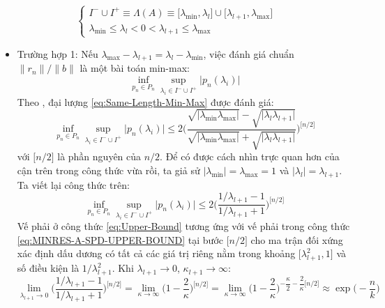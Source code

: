 \documentclass[14pt, a4paper]{article}
\numberwithin{equation}{section}
\numberwithin{algorithm}{section}
\numberwithin{figure}{section}
\numberwithin{dl}{section}
\numberwithin{md}{section}
\numberwithin{bd}{section}
\numberwithin{dn}{section}
\numberwithin{hq}{section}
\begin{document}
\begin{enumerate}[a)]
    \begin{equation}
        \begin{cases}
            I^- \cup I^+ \equiv \Lambda(A) \equiv \lbrack \lambda_{\min}, \lambda_l \rbrack \cup \lbrack \lambda_{l+1}, \lambda_{\max} \rbrack \\
            \lambda_{\min} \leq \lambda_l < 0 < \lambda_{l+1} \leq \lambda_{\max}
        \end{cases}
    \end{equation}
    \begin{itemize}
        \item Trường hợp 1: Nếu $\lambda_{\max} - \lambda_{l+1}=\lambda_{l} - \lambda_{\min}$, việc đánh giá chuẩn $\lVert r_n \rVert / \lVert b \rVert$ là một bài toán min-max:
        \begin{equation} \label{eq:Same-Length-Min-Max}
            \inf_{p_n \in P_n} \sup_{\lambda_i \in I^- \cup I^+} \lvert p_n(\lambda_i) \rvert
        \end{equation}
        Theo \cite{de1982extremal}, đại lượng \ref{eq:Same-Length-Min-Max} được đánh giá:
        \begin{equation} \label{eq:Same-Length-Upper-Bound}
            \inf_{p_n \in P_n} \sup_{\lambda_i \in I^- \cup I^+} \lvert p_n(\lambda_i) \rvert \leq 2 \Bigg( \dfrac{\sqrt{\lvert \lambda_{\min} \lambda_{\max} \rvert} - \sqrt{\lvert \lambda_{l} \lambda_{l+1} \rvert}}{\sqrt{\lvert \lambda_{\min} \lambda_{\max} \rvert} + \sqrt{\lvert \lambda_{l} \lambda_{l+1} \rvert}} \Bigg)^{\lbrack n/2 \rbrack}
        \end{equation}
        với $\lbrack n/2 \rbrack$ là phần nguyên của $n/2$. Để có được cách nhìn trực quan hơn của cận trên trong công thức vừa rồi, ta giả sử $\lvert \lambda_{\min} \rvert=\lambda_{\max}=1$ và $\lvert \lambda_l \rvert=\lambda_{l+1}$. Ta viết lại công thức trên:
        \begin{equation} \label{eq:Upper-Bound}
            \inf_{p_n \in P_n} \sup_{\lambda_i \in I^- \cup I^+} \lvert p_n(\lambda_i) \rvert \leq 2 \Bigg( \dfrac{1/\lambda_{l+1}-1}{1/\lambda_{l+1}+1} \Bigg)^{\lbrack n/2 \rbrack}
        \end{equation}
        Vế phải ở công thức \ref{eq:Upper-Bound} tương ứng với vế phải trong công thức \ref{eq:MINRES-A-SPD-UPPER-BOUND} tại bước $\lbrack n/2 \rbrack$ cho ma trận đối xứng xác định dấu dương có tất cả các giá trị riêng nằm trong khoảng $\lbrack \lambda_{l+1}^2, 1 \rbrack$ và số điều kiện là $1/\lambda_{l+1}^2$. Khi $\lambda_{l+1} \rightarrow 0$, $\kappa_{l+1}\rightarrow \infty$:
        \begin{equation}
                \lim_{\lambda_{l+1} \rightarrow 0} \Bigg( \dfrac{1/\lambda_{l+1}-1}{1/\lambda_{l+1}+1} \Bigg)^{\lbrack n/2 \rbrack}=\lim_{\kappa \rightarrow \infty}\Bigg( 1 - \dfrac{2}{\kappa} \Bigg)^{\lbrack n/2 \rbrack}=\lim_{\kappa \rightarrow \infty} \Bigg( 1 - \dfrac{2}{\kappa} \Bigg)^{-\dfrac{\kappa}{2}-\dfrac{2}{\kappa}\lbrack n/2 \rbrack} \approx \exp \Big( - \dfrac{n}{k} \Big)
        \end{equation}


\end{itemize}
\end{enumerate}
\end{document}
